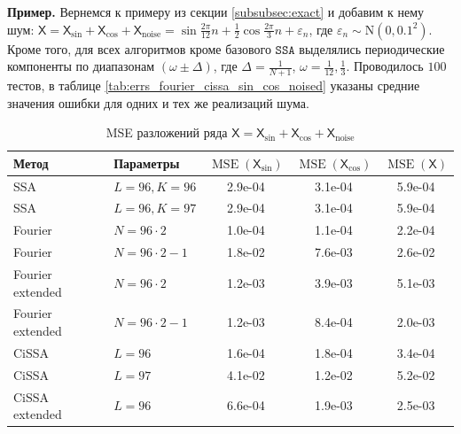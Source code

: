 \documentclass[12pt, specialist, subf
]{disser}
\theoremstyle{definition}
\newcommand{\SSA}{\texttt{SSA}}
\newcommand{\TS}{\mathsf{X}}
\begin{document}
\textbf{\large{Пример.}} Вернемся к примеру из секции \ref{subsubsec:exact} и добавим к нему шум: $\TS = \TS_{\sin} + \TS_{\cos} + \TS_{\mathrm{noise}} = \sin{\frac{2\pi}{12}n} + \frac{1}{2}\cos{\frac{2\pi}{3}n} + \varepsilon_n$, где $\varepsilon_n \sim \mathrm N(0, 0.1^2)$.
Кроме того, для всех алгоритмов кроме базового $\SSA$ выделялись периодические компоненты по диапазонам $\left(\omega \pm \Delta \right)$, где $\Delta = \frac{1}{N+1}$, $\omega = \frac{1}{12}, \frac{1}{3}$.
Проводилось $100$ тестов, в таблице \ref{tab:errs_fourier_cissa_sin_cos_noised} указаны средние значения ошибки для одних и тех же реализаций шума.
\begin{table}[H]
	\caption{MSE разложений ряда $\TS = \TS_{\sin} + \TS_{\cos} +\TS_{\mathrm{noise}}$ }
	\centering
	\begin{tabular}{l|l|ccc}
		\hline
		Метод              & Параметры            & $\operatorname{MSE}(\TS_{\sin})$ & $\operatorname{MSE}(\TS_{\cos})$ & $\operatorname{MSE}(\TS)$ \\
		\hline
		SSA                & $L = 96, K = 96 $    & 2.9e-04                          & 3.1e-04                          & 5.9e-04                   \\
		SSA                & $L = 96, K = 97 $    & 2.9e-04                          & 3.1e-04                          & 5.9e-04                   \\
		\hline
		Fourier            & $N = 96 \cdot 2$     & 1.0e-04                          & 1.1e-04                          & 2.2e-04                   \\
		Fourier            & $N = 96 \cdot 2 - 1$ & 1.8e-02                          & 7.6e-03                          & 2.6e-02                   \\
		\hline
		Fourier extended   & $N = 96 \cdot 2$     & 1.2e-03                          & 3.9e-03                          & 5.1e-03                   \\
		Fourier extended   & $N = 96 \cdot 2 - 1$ & 1.2e-03                          & 8.4e-04                          & 2.0e-03                   \\
		\hline
		CiSSA              & $L = 96$             & 1.6e-04                          & 1.8e-04                          & 3.4e-04                   \\
		CiSSA              & $L = 97$             & 4.1e-02                          & 1.2e-02                          & 5.2e-02                   \\
		\hline
		CiSSA extended     & $L = 96$             & 6.6e-04                          & 1.9e-03                          & 2.5e-03                   \\

\end{tabular}
\end{table}
\end{document}

